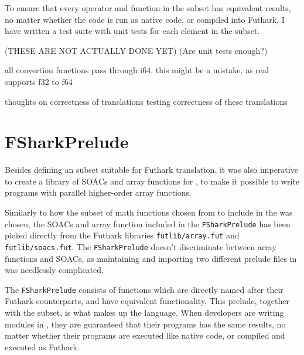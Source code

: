 To ensure that every operator and function in the \fshark{} subset has
equivalent results, no matter whether the \fshark{} code is run as native
\fsharp{} code, or compiled into Futhark, I have written a test suite with unit
tests for each element in the \fsharp{} subset. 


(THESE ARE NOT ACTUALLY DONE YET)
(Are unit tests enough?)

all convertion functions pass through i64. this might be a mistake, as real
supports f32 to f64

thoughts on correctness of translations
testing correctness of these translations


\chapter{FSharkPrelude}
Besides defining an \fsharp{} subset suitable for Futhark translation, it was
also imperative to create a library of SOACs and array functions for \fshark{},
to make it possible to write programs with parallel higher-order array
functions.

Similarly to how the subset of math functions chosen from \fsharp{} to include in
the \fshark{} was chosen, the SOACs and array function included in the
\texttt{FSharkPrelude} has been picked directly from the Futhark libraries
\texttt{futlib/array.fut} and \texttt{futlib/soacs.fut}. The \texttt{FSharkPrelude} doesn't
discriminate between array functions and SOACs, as maintaining and importing two
different prelude files in \fshark{} was needlessly complicated.

The \texttt{FSharkPrelude} consists of functions which are directly named after
their Futhark counterparts, and have equivalent functionality.
This prelude, together with the \fshark{} subset, is what makes up the \fshark{} language.
When \fshark{} developers are writing modules in \fshark{}, they are guaranteed
that their \fshark{} programs has the same results, no matter whether their
programs are executed like native \fsharp{} code, or compiled and executed as
Futhark.


